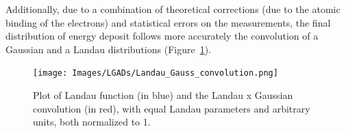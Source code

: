 Additionally, due to a combination of theoretical corrections \cite{PhysRevA.11.1286} (due to the atomic binding of the electrons) and statistical errors on the measurements, the final distribution of energy deposit follows more accurately the convolution of a Gaussian and a Landau distributions (Figure~\ref{fig:langau_convolution_plot}).

\begin{figure}
    \centering
    \texttt{[image: Images/LGADs/Landau\_Gauss\_convolution.png]}
    \captionsetup{width=\captionwidth}
    \caption{Plot of Landau function (in blue) and the Landau x Gaussian convolution (in red), with equal Landau parameters and arbitrary units, both normalized to 1.}
    \label{fig:langau_convolution_plot}
\end{figure}

